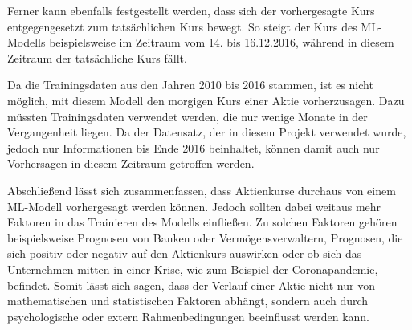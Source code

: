 Ferner kann ebenfalls festgestellt werden, dass sich der vorhergesagte Kurs entgegengesetzt zum tatsächlichen Kurs bewegt. So steigt der Kurs des ML-Modells beispielsweise im Zeitraum vom 14. bis 16.12.2016, während in diesem Zeitraum der tatsächliche Kurs fällt. 


Da die Trainingsdaten aus den Jahren 2010 bis 2016 stammen, ist es nicht möglich, mit diesem Modell den morgigen Kurs einer Aktie vorherzusagen. Dazu müssten Trainingsdaten verwendet werden, die nur wenige Monate in der Vergangenheit liegen. Da der Datensatz, der in diesem Projekt verwendet wurde, jedoch nur Informationen bis Ende 2016 beinhaltet, können damit auch nur Vorhersagen in diesem Zeitraum getroffen werden.

Abschließend lässt sich zusammenfassen, dass Aktienkurse durchaus von einem ML-Modell vorhergesagt werden können. Jedoch sollten dabei weitaus mehr Faktoren in das Trainieren des Modells einfließen. Zu solchen Faktoren gehören beispielsweise Prognosen von Banken oder Vermögensverwaltern, Prognosen, die sich positiv oder negativ auf den Aktienkurs auswirken oder ob sich das Unternehmen mitten in einer Krise, wie zum Beispiel der Coronapandemie, befindet. Somit lässt sich sagen, dass der Verlauf einer Aktie nicht nur von mathematischen und statistischen Faktoren abhängt, sondern auch durch psychologische oder extern Rahmenbedingungen beeinflusst werden kann.